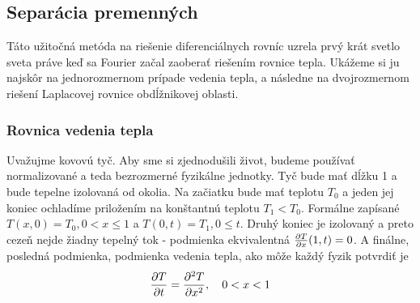 \subsection{Separácia premenných}

Táto užitočná metóda na riešenie diferenciálnych rovníc uzrela prvý
krát svetlo sveta práve keď sa Fourier začal zaoberať riešením rovnice
tepla. Ukážeme si ju najskôr na jednorozmernom prípade vedenia tepla,
a následne na dvojrozmernom riešení Laplacovej rovnice obdĺžnikovej
oblasti.

\subsubsection{Rovnica vedenia tepla}

Uvažujme kovovú tyč. Aby sme si zjednodušili život, budeme používať
normalizované a teda bezrozmerné fyzikálne jednotky. Tyč bude mať
dĺžku 1 a bude tepelne izolovaná od okolia. Na začiatku bude mať
teplotu $T_0$ a jeden jej koniec ochladíme priložením na konštantnú
teplotu $T_1<T_0$. Formálne zapísané
$T(x,0) = T_0, 0<x\le1$ a $T(0,t)=T_1, 0\le t$. Druhý koniec je izolovaný a preto
cezeň nejde žiadny tepelný tok - podmienka ekvivalentná
$\frac{\partial T}{\partial x}(1,t)=0$. A finálne, posledná podmienka, podmienka
vedenia tepla, ako môže každý fyzik potvrdiť je
\begin{equation}
    \frac{\partial T}{\partial t} = \frac{\partial^2 T}{\partial x^2}, \quad0<x<1
    \label{eq:heat}
\end{equation}


